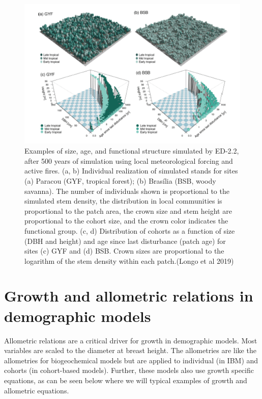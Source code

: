 \documentclass[12pt,oneside]{book}
\begin{document}
\begin{figure}

{\centering \includegraphics[width=0.8\linewidth]{figures/chap6/f619_ED_amazon} 

}

\caption{ Examples of size, age, and functional structure simulated by ED-2.2, after 500 years of simulation using local meteorological forcing and active fires. (a, b) Individual realization of simulated stands for sites (a) Paracou (GYF, tropical forest); (b) Brasília (BSB, woody savanna). The number of individuals shown is proportional to the simulated stem density, the distribution in local communities is proportional to the patch area, the crown size and stem height are proportional to the cohort size, and the crown color indicates the functional group. (c, d) Distribution of cohorts as a function of size (DBH and height) and age since last disturbance (patch age) for sites (c) GYF and (d) BSB. Crown sizes are proportional to the logarithm of the stem density within each patch.(Longo et al 2019)}\label{fig:f619}
\end{figure}

\section{Growth and allometric relations in demographic
models}\label{growth-and-allometric-relations-in-demographic-models}

Allometric relations are a critical driver for growth in demographic
models. Most variables are scaled to the diameter at breast height. The
allometries are like the allometries for biogeochemical models but are
applied to individual (in IBM) and cohorts (in cohort-based models).
Further, these models also use growth specific equations, as can be seen
below where we will typical examples of growth and allometric equations.
\end{document}
